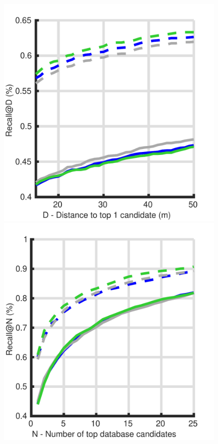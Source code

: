\begin{figure}
	\centering
	
	\begin{minipage}{0.27\linewidth}
		\center \scriptsize
		\includegraphics[width=\linewidth]{plot/depth_vs_ref/Results_cmu_lt/distance}	
		
		\includegraphics[width=\linewidth]{plot/depth_vs_ref/Results_cmu_lt/recall}
		

\end{minipage}
\end{figure}
